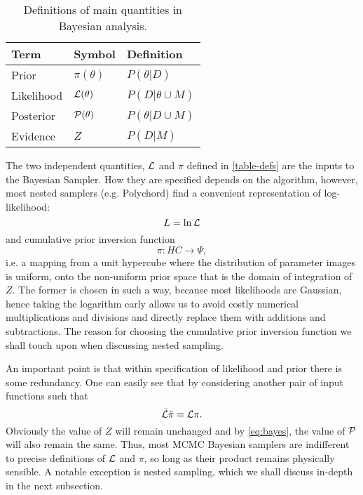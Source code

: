 \documentclass[usenatbib]{mnras}
\begin{document}
\begin{table}
\caption{Definitions of main quantities in Bayesian analysis. \label{table-defs}}
\centering
\begin{tabular}{lll}
\textbf{\textbf{Term}} & \textbf{\textbf{Symbol}} & \textbf{\textbf{Definition}}\\
\hline
Prior & \(\pi(\theta)\) & \(P ( \theta  \vert D)\)\\
Likelihood & \({\cal L}(\theta)\) & \(P ( D \vert \theta \cup M)\)\\
Posterior & \({\cal P}(\theta)\) & \(P ( \theta \vert D \cup M)\)\\
Evidence & \(Z\) & \(P ( D \vert M)\)\\
\end{tabular}
\end{table}

The two independent quantities, \({\cal L}\) and \(\pi\) defined in \autoref{table-defs} are the
inputs to the Bayesian Sampler. How they are specified depends on the algorithm, however, most nested samplers (e.g. Polychord) find a convenient representation of log-likelihood: 
\begin{equation}
  L = \ln \cal L
\end{equation}
and cumulative prior inversion function 
\begin{equation}
 \pi : HC \rightarrow \Psi,
\end{equation}
i.e. a mapping from a unit hypercube where the distribution of
parameter images is uniform, onto the non-uniform prior space that
is the domain of integration of \(Z\). The former is chosen in such
a way, because most likelihoods are Gaussian, hence taking the
logarithm early allows us to avoid costly numerical multiplications
and divisions and directly replace them with additions and
subtractions. The reason for choosing the cumulative prior inversion function
we shall touch upon when discussing nested sampling.

An important point is that within specification of likelihood and
prior there is some redundancy. One can easily see that by
considering another pair of input functions such that 
\begin{equation}
  \tilde{\cal L} \tilde{\pi} = \cal L \pi. 
  \label{eqn:PPR}
\end{equation}
Obviously the value of \(Z\) will remain unchanged and by
\autoref{eq:bayes}, the value of \(\cal P\) will also remain the
same. Thus, most MCMC Bayesian samplers are indifferent to precise
definitions of \(\cal L\) and \(\pi\), so long as their product
remains physically sensible. A notable exception is nested
sampling, which we shall discuss in-depth in the next subsection.
\end{document}
